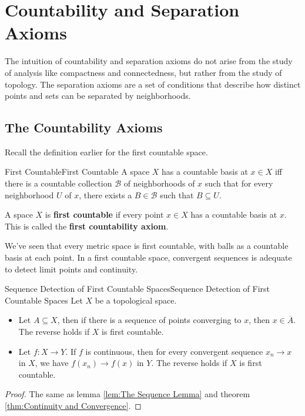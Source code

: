 \documentclass[../main.tex]{subfiles}
\begin{document}
\chapter{Countability and Separation Axioms}

The intuition of countability and separation axioms do not arise from the study of analysis like compactness and connectedness, but rather from the study of topology. The separation axioms are a set of conditions that describe how distinct points and sets can be separated by neighborhoods.

\section{The Countability Axioms}

Recall the definition earlier for the first countable space.
\begin{definition}{First Countable}{First Countable}
	A space $X$ has a countable basis at $x\in X$ iff there is a countable collection $\mathcal{B}$ of neighborhoods of $x$ such that for every neighborhood $U$ of $x$, there exists a $B\in\mathcal{B}$ such that $B\subseteq U$.

	A space $X$ is \textbf{first countable} if every point $x\in X$ has a countable basis at $x$. This is called the \textbf{first countability axiom}.
\end{definition}

We've seen that every metric space is first countable, with balls as a countable basis at each point. In a first countable space, convergent sequences is adequate to detect limit points and continuity.

\begin{theorem}{Sequence Detection of First Countable Spaces}{Sequence Detection of First Countable Spaces}
Let $X$ be a topological space.
\begin{itemize}
\item Let $A \subseteq X$, then if there is a sequence of points converging to $x$, then $x\in \overline{A}$. The reverse holds if $X$ is first countable.
\item Let $f: X \rightarrow Y$. If $f$ is continuous, then for every convergent sequence $x_n \rightarrow x$ in $X$, we have $f(x_n) \rightarrow f(x)$ in $Y$. The reverse holds if $X$ is first countable.
\end{itemize}
\end{theorem}
\begin{proof}
	The same as lemma \ref{lem:The Sequence Lemma} and theorem \ref{thm:Continuity and Convergence}.
\end{proof}
\end{document}
